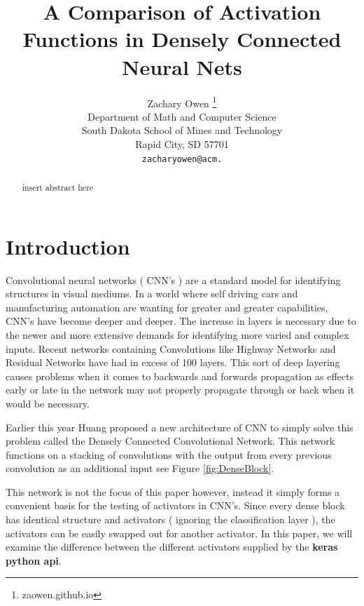 \documentclass{article}
\title{A Comparison of Activation Functions in Densely Connected Neural Nets}
\author{
  Zachary Owen
  \thanks{ zaowen.github.io } \\
  Department of Math and Computer Science\\
  South Dakota School of Mines and Technology\\ 
  Rapid City, SD 57701 \\
  \texttt{zacharyowen@acm.} \\
}
\begin{document}

\maketitle

\begin{abstract}
        insert abstract here
\end{abstract}

\section{Introduction}

Convolutional neural networks ( CNN's ) are a standard model for identifying structures in visual mediums.
In a world where self driving cars and manufacturing automation are wanting for greater and greater capabilities, CNN's have become deeper and deeper.
The increase in layers is necessary due to the newer and more extensive demands for identifying more varied and complex inputs.
Recent networks containing Convolutions like Highway Networks and Residual Networks have had in excess of 100 layers.
This sort of deep layering causes problems when it comes to backwards and forwards propagation as effects early or late in the network may not properly propagate through or back when it would be necessary.

Earlier this year Huang proposed a new architecture of CNN to simply solve this problem called the Densely Connected Convolutional Network.
This network functions on a stacking of convolutions with the output from every previous convolution as an additional input see Figure \ref{fig:DenseBlock}.

This network is not the focus of this paper however, instead it simply forms a convenient basis for the testing of activators in CNN's.
Since every dense block has identical structure and activators ( ignoring the classification layer ), the activators can be easily swapped out for another activator.
In this paper, we will examine the difference between the different activators supplied by the \textbf{keras python api}.
\end{document}
